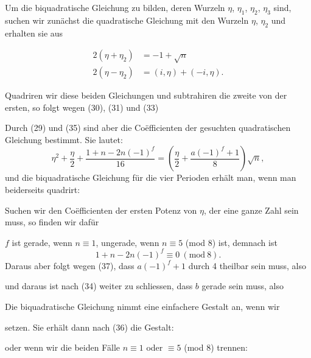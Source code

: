 
Um die biquadratische Gleichung zu bilden, deren Wurzeln $\eta$,
$\eta_1$, $\eta_2$, $\eta_3$ sind, suchen wir zunächst die quadratische Gleichung
mit den Wurzeln $\eta$, $\eta_2$ und erhalten sie aus

\[
\begin{aligned}
2(\eta+\eta_2)&=-1+\sqrt{n}\\
2(\eta-\eta_2)&=(i,\eta)+(-i,\eta).
\end{aligned}
\]

Quadriren wir diese beiden Gleichungen und subtrahiren die
zweite von der ersten, so folgt wegen (30), (31) und (33)


Durch (29) und (35) sind aber die Coëfficienten der gesuchten
quadratischen Gleichung bestimmt. Sie lautet:
\[
\eta^2+\frac{\eta}{2}+\frac{1+n-2n(-1)^f}{16}=\left(\frac{\eta}{2}+\frac{a(-1)^f+1}{8}\right)\sqrt{n},
\]
und die biquadratische Gleichung für die vier Perioden erhält
man, wenn man beiderseits quadrirt:


Suchen wir den Coëfficienten der ersten Potenz von $\eta$, der
eine ganze Zahl sein muss, so finden wir dafür


$f$ ist gerade, wenn $n\equiv 1$, ungerade, wenn $n\equiv 5$ (mod 8) ist,
demnach ist
\[
1+n-2n(-1)^f\equiv 0\ (\mathrm{mod}\ 8).
\]
Daraus aber folgt wegen (37), dass $a(-1)^f+1$ durch 4
theilbar sein muss, also


und daraus ist nach (34) weiter zu schliessen, dass $b$ gerade
sein muss, also


Die biquadratische Gleichung nimmt eine einfachere Gestalt
an, wenn wir


setzen. Sie erhält dann nach (36) die Gestalt:


oder wenn wir die beiden Fälle $n\equiv 1$ oder $\equiv 5$ (mod 8) trennen:


